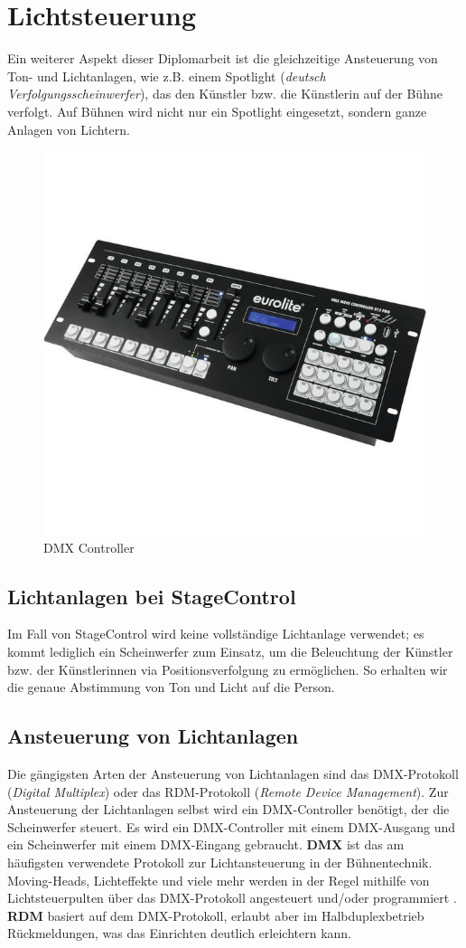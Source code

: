 \section{Lichtsteuerung}
Ein weiterer Aspekt dieser Diplomarbeit ist die gleichzeitige Ansteuerung von Ton- und Lichtanlagen, wie z.B. einem Spotlight (\textit{deutsch Verfolgungsscheinwerfer}), das den Künstler bzw. die Künstlerin auf der Bühne verfolgt. Auf Bühnen wird nicht nur ein Spotlight eingesetzt, sondern ganze Anlagen von Lichtern. 

\begin{figure}[H]
	\centering
	\includegraphics[width=0.7\linewidth]{images/DMXController.jpg}
	\caption[DMX Controller]{DMX Controller}
	\label{fig:DMXController}
\end{figure}

\subsection{Lichtanlagen bei StageControl}
Im Fall von StageControl wird keine vollständige Lichtanlage verwendet; es kommt lediglich ein Scheinwerfer zum Einsatz, um die Beleuchtung der Künstler bzw. der Künstlerinnen via Positionsverfolgung zu ermöglichen. So erhalten wir die genaue Abstimmung von Ton und Licht auf die Person.

\subsection{Ansteuerung von Lichtanlagen}

Die gängigsten Arten der Ansteuerung von Lichtanlagen sind das DMX-Protokoll (\textit{Digital Multiplex}) oder das RDM-Protokoll (\textit{Remote Device Management}). Zur Ansteuerung der Lichtanlagen selbst wird ein DMX-Controller benötigt, der die Scheinwerfer steuert. Es wird ein DMX-Controller mit einem DMX-Ausgang und ein Scheinwerfer mit einem DMX-Eingang gebraucht.
\textbf{DMX} ist das am häufigsten verwendete Protokoll zur Lichtansteuerung in der Bühnentechnik. Moving-Heads, Lichteffekte und viele mehr werden in der Regel mithilfe von Lichtsteuerpulten über das DMX-Protokoll angesteuert und/oder programmiert \parencite{LichtanlageRDMDMX}.
\textbf{RDM} basiert auf dem DMX-Protokoll, erlaubt aber im Halbduplexbetrieb Rückmeldungen, was das Einrichten deutlich erleichtern kann.\\


